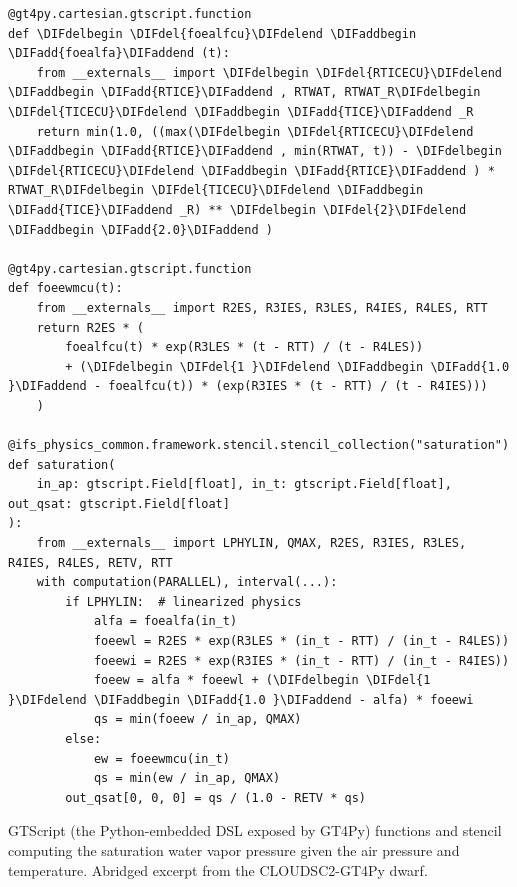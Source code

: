 \documentclass[gmd,manuscript,online]{copernicus}
\makeatletter
\theoremstyle{theorem}
\theoremstyle{definition}
\theoremstyle{remark}
\theoremstyle{proposition}
\providecommand{\DIFadd}[1]{{\protect\color{blue}\uwave{#1}}} %
\providecommand{\DIFdel}[1]{{\protect\color{red}\sout{#1}}} %
\providecommand{\DIFaddbegin}{} %
\providecommand{\DIFaddend}{} %
\providecommand{\DIFdelbegin}{} %
\providecommand{\DIFdelend}{} %
\newcommand{\DIFscaledelfig}{0.5}
\newlength{\DIFdelgraphicswidth} %
\newlength{\DIFdelgraphicsheight} %
\newcommand{\DIFaddincludegraphics}[2][]{{\color{blue}\fbox{\DIFOincludegraphics[#1]{#2}}}} %
\newcommand{\DIFdelincludegraphics}[2][]{%
\sbox{\DIFdelgraphicsbox}{\DIFOincludegraphics[#1]{#2}}%
\settoboxwidth{\DIFdelgraphicswidth}{\DIFdelgraphicsbox} %
\settoboxtotalheight{\DIFdelgraphicsheight}{\DIFdelgraphicsbox} %
\scalebox{\DIFscaledelfig}{%
\parbox[b]{\DIFdelgraphicswidth}{\usebox{\DIFdelgraphicsbox}\\[-\baselineskip] \rule{\DIFdelgraphicswidth}{0em}}\llap{\resizebox{\DIFdelgraphicswidth}{\DIFdelgraphicsheight}{%
\setlength{\unitlength}{\DIFdelgraphicswidth}%
\begin{picture}(1,1)%
\thicklines\linethickness{2pt} %
{\color[rgb]{1,0,0}\put(0,0){\framebox(1,1){}}}%
{\color[rgb]{1,0,0}\put(0,0){\line( 1,1){1}}}%
{\color[rgb]{1,0,0}\put(0,1){\line(1,-1){1}}}%
\end{picture}%
}\hspace*{3pt}}} %
} %
\DeclareRobustCommand{\DIFaddbegin}{\DIFOaddbegin \let\includegraphics\DIFaddincludegraphics} %
\DeclareRobustCommand{\DIFaddend}{\DIFOaddend \let\includegraphics\DIFOincludegraphics} %
\DeclareRobustCommand{\DIFdelbegin}{\DIFOdelbegin \let\includegraphics\DIFdelincludegraphics} %
\DeclareRobustCommand{\DIFdelend}{\DIFOaddend \let\includegraphics\DIFOincludegraphics} %
\let\sout@orig\sout %
\renewcommand{\sout}[1]{\ifmmode\text{\sout@orig{\ensuremath{#1}}}\else\sout@orig{#1}\fi} %
\makeatother
\begin{document}
	\begin{listing}[t!]
		\begin{verbatim}
@gt4py.cartesian.gtscript.function
def \DIFdelbegin \DIFdel{foealfcu}\DIFdelend \DIFaddbegin \DIFadd{foealfa}\DIFaddend (t):
    from __externals__ import \DIFdelbegin \DIFdel{RTICECU}\DIFdelend \DIFaddbegin \DIFadd{RTICE}\DIFaddend , RTWAT, RTWAT_R\DIFdelbegin \DIFdel{TICECU}\DIFdelend \DIFaddbegin \DIFadd{TICE}\DIFaddend _R
    return min(1.0, ((max(\DIFdelbegin \DIFdel{RTICECU}\DIFdelend \DIFaddbegin \DIFadd{RTICE}\DIFaddend , min(RTWAT, t)) - \DIFdelbegin \DIFdel{RTICECU}\DIFdelend \DIFaddbegin \DIFadd{RTICE}\DIFaddend ) * RTWAT_R\DIFdelbegin \DIFdel{TICECU}\DIFdelend \DIFaddbegin \DIFadd{TICE}\DIFaddend _R) ** \DIFdelbegin \DIFdel{2}\DIFdelend \DIFaddbegin \DIFadd{2.0}\DIFaddend )

@gt4py.cartesian.gtscript.function
def foeewmcu(t):
    from __externals__ import R2ES, R3IES, R3LES, R4IES, R4LES, RTT
    return R2ES * (
        foealfcu(t) * exp(R3LES * (t - RTT) / (t - R4LES))
        + (\DIFdelbegin \DIFdel{1 }\DIFdelend \DIFaddbegin \DIFadd{1.0 }\DIFaddend - foealfcu(t)) * (exp(R3IES * (t - RTT) / (t - R4IES)))
    )

@ifs_physics_common.framework.stencil.stencil_collection("saturation")
def saturation(
    in_ap: gtscript.Field[float], in_t: gtscript.Field[float], out_qsat: gtscript.Field[float]
):
    from __externals__ import LPHYLIN, QMAX, R2ES, R3IES, R3LES, R4IES, R4LES, RETV, RTT
    with computation(PARALLEL), interval(...):
        if LPHYLIN:  # linearized physics
            alfa = foealfa(in_t)
            foeewl = R2ES * exp(R3LES * (in_t - RTT) / (in_t - R4LES))
            foeewi = R2ES * exp(R3IES * (in_t - RTT) / (in_t - R4IES))
            foeew = alfa * foeewl + (\DIFdelbegin \DIFdel{1 }\DIFdelend \DIFaddbegin \DIFadd{1.0 }\DIFaddend - alfa) * foeewi
            qs = min(foeew / in_ap, QMAX)
        else:
            ew = foeewmcu(in_t)
            qs = min(ew / in_ap, QMAX)
        out_qsat[0, 0, 0] = qs / (1.0 - RETV * qs)
		\end{verbatim}

		\caption{GTScript (the Python-embedded DSL exposed by GT4Py) functions and stencil computing the saturation water vapor pressure given the air pressure and temperature. Abridged excerpt from the CLOUDSC2-GT4Py dwarf.}
		\label{lst:saturation-stencil}
	\end{listing}

\end{document}
